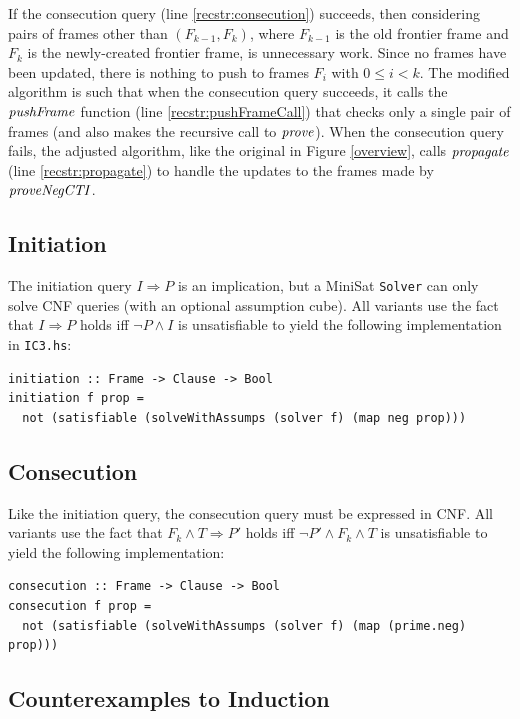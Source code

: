 \documentclass[12pt,a4paper,twoside,openright]{report}
\begin{document}
{{If the consecution query (line \ref{recstr:consecution}) succeeds, then
considering pairs of frames other
than $(F_{k - 1}, F_k)$, where $F_{k - 1}$ is the old frontier frame and $F_k$ is
the newly-created frontier frame, is unnecessary work.
Since no frames have been updated, there is nothing to push to frames $F_i$ with
$0 \leq i < k$.
The modified algorithm is such
that when the consecution query succeeds, it calls the ${\it pushFrame}$ function
(line \ref{recstr:pushFrameCall}) that
checks only a single pair of frames (and also makes the recursive call to ${\it prove}$).
When the consecution query fails, the adjusted algorithm, like the original in Figure \ref{overview},
calls ${\it propagate}$ (line \ref{recstr:propagate})
to handle the updates to the frames made by ${\it proveNegCTI}$.

\subsection{Initiation}

The initiation query $I \Rightarrow P$ is an implication, but a MiniSat \verb,Solver, can only
solve CNF queries (with an optional assumption cube).
All variants use the fact that
$I \Rightarrow P$ holds iff $\neg P \wedge I$ is unsatisfiable to yield
the following implementation in \verb,IC3.hs,:

\begin{lstlisting}
initiation :: Frame -> Clause -> Bool
initiation f prop =
  not (satisfiable (solveWithAssumps (solver f) (map neg prop)))
\end{lstlisting}

\subsection{Consecution}

Like the initiation query, the consecution query must be expressed in CNF.
All variants use the fact that
$F_k \wedge T \Rightarrow P'$ holds iff $\neg P' \wedge F_k \wedge T$ is unsatisfiable
to yield the following implementation:
\begin{lstlisting}
consecution :: Frame -> Clause -> Bool
consecution f prop =
  not (satisfiable (solveWithAssumps (solver f) (map (prime.neg) prop)))
\end{lstlisting}

\subsection{Counterexamples to Induction}

}}
\end{document}
